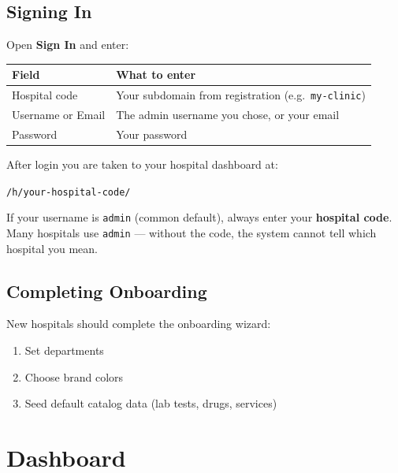 \documentclass[11pt,a4paper]{report}
\begin{document}
\section{Signing In}

Open \textbf{Sign In} and enter:

\begin{table}[h]
\centering
\begin{tabular}{@{}lp{8cm}@{}}
\toprule
\textbf{Field} & \textbf{What to enter} \\
\midrule
Hospital code & Your subdomain from registration (e.g.\ \texttt{my-clinic}) \\
Username or Email & The admin username you chose, or your email \\
Password & Your password \\
\bottomrule
\end{tabular}
\end{table}

After login you are taken to your hospital dashboard at:
\begin{center}
\texttt{/h/your-hospital-code/}
\end{center}

\begin{tipbox}
If your username is \texttt{admin} (common default), always enter your \textbf{hospital code}. Many hospitals use \texttt{admin} --- without the code, the system cannot tell which hospital you mean.
\end{tipbox}

\section{Completing Onboarding}

New hospitals should complete the onboarding wizard:
\begin{enumerate}[noitemsep]
    \item Set departments
    \item Choose brand colors
    \item Seed default catalog data (lab tests, drugs, services)
\end{enumerate}

\chapter{Dashboard}
\end{document}

